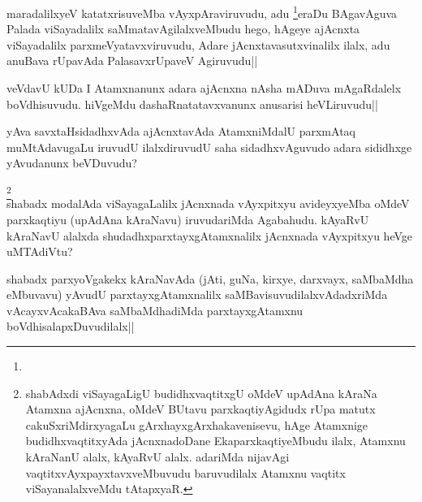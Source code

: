\begin{artha} 
maradalilxyeV katatxrisuveMba vAyxpAraviruvudu, adu 
\footnote[2]{}eraDu BAgavAguva Palada viSayadalilx 
saMmatavAgilalxveMbudu hego, hAgeye ajAcnxta viSayadalilx 
parxmeVyatavxviruvudu, Adare jAcnxtavasutxvinalilx ilalx, adu anuBava 
rUpavAda PalasavxrUpaveV Agiruvudu||
\end{artha}

\begin{artha} 
veVdavU kUDa I Atamxnanunx adara ajAcnxna nAsha mADuva mAgaRdalelx 
boVdhisuvudu. hiVgeMdu dashaRnatatavxvanunx anusarisi heVLiruvudu||
\end{artha}

\begin{artha} 
yAva savxtaHsidadhxvAda ajAcnxtavAda AtamxniMdalU parxmAtaq 
muMtAdavugaLu iruvudU ilalxdiruvudU saha sidadhxvAguvudo adara 
sididhxge yAvudanunx beVDuvudu?  
\end{artha}


\begin{artha} 
\footnote[1]{shabAdxdi viSayagaLigU budidhxvaqtitxgU oMdeV upAdAna 
kAraNa Atamxna ajAcnxna, oMdeV BUtavu parxkaqtiyAgidudx rUpa matutx 
cakuSxriMdirxyagaLu gArxhayxgArxhakavenisevu, hAge Atamxnige 
budidhxvaqtitxyAda jAcnxnadoDane EkaparxkaqtiyeMbudu ilalx, Atamxnu 
kAraNanU alalx, kAyaRvU alalx. adariMda nijavAgi 
vaqtitxvAyxpayxtavxveMbuvudu baruvudilalx Atamxnu vaqtitx 
viSayanalalxveMdu tAtapxyaR.}\\
shabadx modalAda viSayagaLalilx jAcnxnada vAyxpitxyu avideyxyeMba 
oMdeV parxkaqtiyu (upAdAna kAraNavu) iruvudariMda Agabahudu. kAyaRvU 
kAraNavU alalxda shudadhxparxtayxgAtamxnalilx jAcnxnada vAyxpitxyu 
heVge uMTAdiVtu?
\end{artha}


\begin{artha} 
shabadx parxyoVgakekx kAraNavAda (jAti, guNa, kirxye, darxvayx, 
saMbaMdha eMbuvavu) yAvudU parxtayxgAtamxnalilx 
saMBavisuvudilalxvAdadxriMda vAcayxvAcakaBAva saMbaMdhadiMda 
parxtayxgAtamxnu boVdhisalapxDuvudilalx||
\end{artha}


